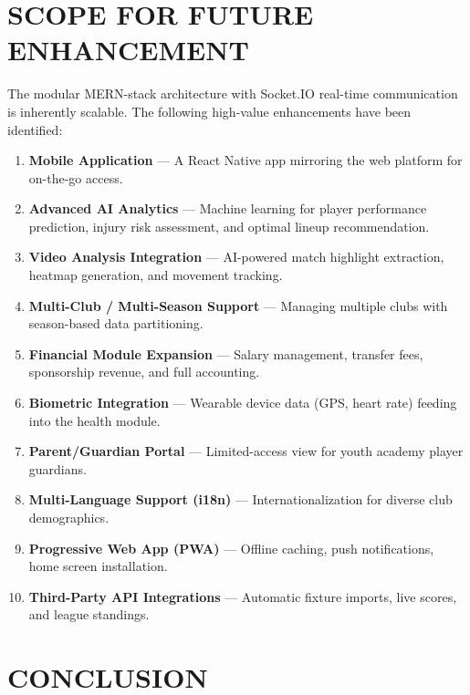 \documentclass[12pt,a4paper,oneside]{report}
\begin{document}
\chapter{SCOPE FOR FUTURE ENHANCEMENT}

The modular MERN-stack architecture with Socket.IO real-time communication is inherently scalable. The following high-value enhancements have been identified:

\begin{enumerate}[leftmargin=*]
  \item \textbf{Mobile Application} --- A React Native app mirroring the web platform for on-the-go access.
  \item \textbf{Advanced AI Analytics} --- Machine learning for player performance prediction, injury risk assessment, and optimal lineup recommendation.
  \item \textbf{Video Analysis Integration} --- AI-powered match highlight extraction, heatmap generation, and movement tracking.
  \item \textbf{Multi-Club / Multi-Season Support} --- Managing multiple clubs with season-based data partitioning.
  \item \textbf{Financial Module Expansion} --- Salary management, transfer fees, sponsorship revenue, and full accounting.
  \item \textbf{Biometric Integration} --- Wearable device data (GPS, heart rate) feeding into the health module.
  \item \textbf{Parent/Guardian Portal} --- Limited-access view for youth academy player guardians.
  \item \textbf{Multi-Language Support (i18n)} --- Internationalization for diverse club demographics.
  \item \textbf{Progressive Web App (PWA)} --- Offline caching, push notifications, home screen installation.
  \item \textbf{Third-Party API Integrations} --- Automatic fixture imports, live scores, and league standings.
\end{enumerate}


\chapter{CONCLUSION}
\end{document}

